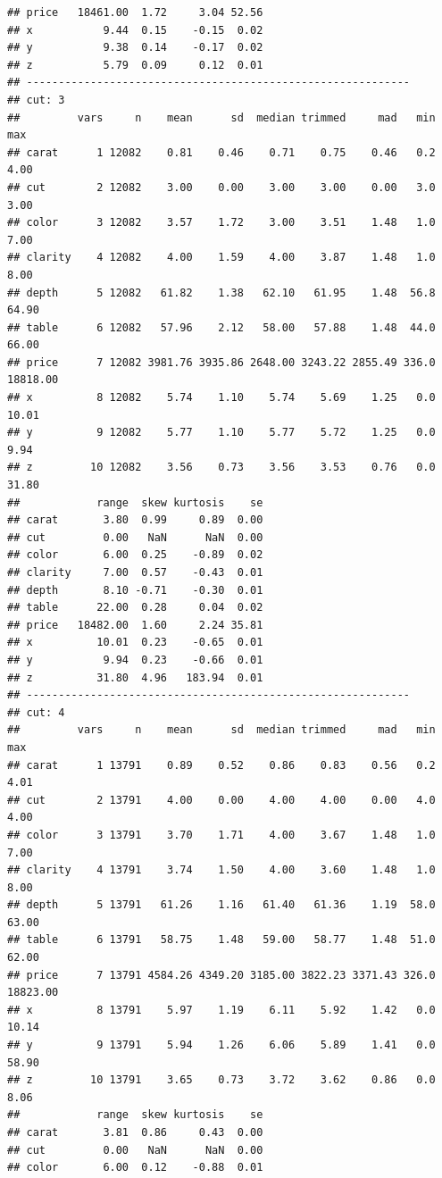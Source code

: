 \documentclass[
]{book}
\begin{document}
\begin{verbatim}
## price   18461.00  1.72     3.04 52.56
## x           9.44  0.15    -0.15  0.02
## y           9.38  0.14    -0.17  0.02
## z           5.79  0.09     0.12  0.01
## ------------------------------------------------------------ 
## cut: 3
##         vars     n    mean      sd  median trimmed     mad   min      max
## carat      1 12082    0.81    0.46    0.71    0.75    0.46   0.2     4.00
## cut        2 12082    3.00    0.00    3.00    3.00    0.00   3.0     3.00
## color      3 12082    3.57    1.72    3.00    3.51    1.48   1.0     7.00
## clarity    4 12082    4.00    1.59    4.00    3.87    1.48   1.0     8.00
## depth      5 12082   61.82    1.38   62.10   61.95    1.48  56.8    64.90
## table      6 12082   57.96    2.12   58.00   57.88    1.48  44.0    66.00
## price      7 12082 3981.76 3935.86 2648.00 3243.22 2855.49 336.0 18818.00
## x          8 12082    5.74    1.10    5.74    5.69    1.25   0.0    10.01
## y          9 12082    5.77    1.10    5.77    5.72    1.25   0.0     9.94
## z         10 12082    3.56    0.73    3.56    3.53    0.76   0.0    31.80
##            range  skew kurtosis    se
## carat       3.80  0.99     0.89  0.00
## cut         0.00   NaN      NaN  0.00
## color       6.00  0.25    -0.89  0.02
## clarity     7.00  0.57    -0.43  0.01
## depth       8.10 -0.71    -0.30  0.01
## table      22.00  0.28     0.04  0.02
## price   18482.00  1.60     2.24 35.81
## x          10.01  0.23    -0.65  0.01
## y           9.94  0.23    -0.66  0.01
## z          31.80  4.96   183.94  0.01
## ------------------------------------------------------------ 
## cut: 4
##         vars     n    mean      sd  median trimmed     mad   min      max
## carat      1 13791    0.89    0.52    0.86    0.83    0.56   0.2     4.01
## cut        2 13791    4.00    0.00    4.00    4.00    0.00   4.0     4.00
## color      3 13791    3.70    1.71    4.00    3.67    1.48   1.0     7.00
## clarity    4 13791    3.74    1.50    4.00    3.60    1.48   1.0     8.00
## depth      5 13791   61.26    1.16   61.40   61.36    1.19  58.0    63.00
## table      6 13791   58.75    1.48   59.00   58.77    1.48  51.0    62.00
## price      7 13791 4584.26 4349.20 3185.00 3822.23 3371.43 326.0 18823.00
## x          8 13791    5.97    1.19    6.11    5.92    1.42   0.0    10.14
## y          9 13791    5.94    1.26    6.06    5.89    1.41   0.0    58.90
## z         10 13791    3.65    0.73    3.72    3.62    0.86   0.0     8.06
##            range  skew kurtosis    se
## carat       3.81  0.86     0.43  0.00
## cut         0.00   NaN      NaN  0.00
## color       6.00  0.12    -0.88  0.01

\end{verbatim}
\end{document}
